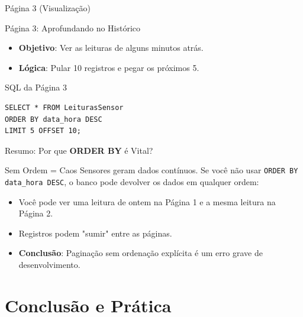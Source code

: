 \documentclass[9pt]{beamer}
\begin{document}
\begin{frame}{Página 3 (Visualização)}
  \centering
\end{frame}
\begin{frame}[fragile]{Página 3: Aprofundando no Histórico}
  \begin{itemize}
    \item \textbf{Objetivo}: Ver as leituras de alguns minutos atrás.
    \item \textbf{Lógica}: Pular 10 registros e pegar os próximos 5.
  \end{itemize}
  \vspace{0.4cm}
  \begin{exampleblock}{SQL da Página 3}
\begin{lstlisting}
SELECT * FROM LeiturasSensor
ORDER BY data_hora DESC
LIMIT 5 OFFSET 10;
\end{lstlisting}
  \end{exampleblock}
\end{frame}
\begin{frame}{Resumo: Por que \textbf{ORDER BY} é Vital?}
  \begin{alertblock}{Sem Ordem = Caos}
    Sensores geram dados contínuos. Se você não usar \texttt{ORDER BY data\_hora DESC}, o banco pode devolver os dados em qualquer ordem:
  \end{alertblock}
  \vspace{0.4cm}
  \begin{itemize}
    \item Você pode ver uma leitura de ontem na Página 1 e a mesma leitura na Página 2.
    \item Registros podem "sumir" entre as páginas.
    \item \textbf{Conclusão}: Paginação sem ordenação explícita é um erro grave de desenvolvimento.
  \end{itemize}
\end{frame}

\section{Conclusão e Prática}
\end{document}
